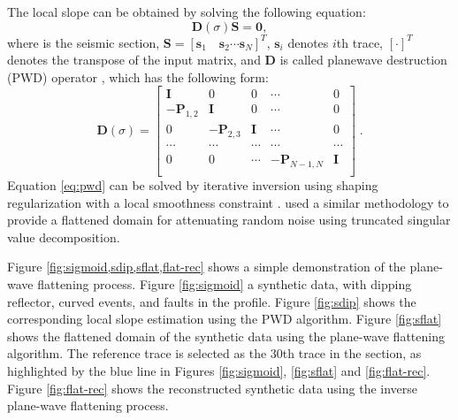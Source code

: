 The local slope can be obtained by solving the following equation:
\begin{equation}
\label{eq:pwd}
\mathbf{D}(\sigma)\mathbf{S} = \mathbf{0},
\end{equation}
where  is the seismic section, $\mathbf{S}=[\mathbf{s}_1\quad\mathbf{s}_2\cdots\mathbf{s}_N]^T$, $\mathbf{s}_i$ denotes $i$th trace, $[\cdot]^T$ denotes the transpose of the input matrix,  and $\mathbf{D}$ is called plane\new{-}wave destruction (PWD) operator \cite[]{fomel2002pwd}, which has the following form:
\begin{equation}
  \label{eq:d}
  \mathbf{D}(\sigma) = 
  \left[\begin{array}{ccccc}
      \mathbf{I} & 0 & 0 & \cdots & 0 \\
      - \mathbf{P}_{1,2} & \mathbf{I} & 0 & \cdots & 0 \\
      0 & - \mathbf{P}_{2,3} & \mathbf{I} & \cdots & 0 \\
      \cdots & \cdots & \cdots & \cdots & \cdots \\
      0 & 0 & \cdots & - \mathbf{P}_{N-1,N} & \mathbf{I} \\
    \end{array}\right]\;.
\end{equation}
Equation \ref{eq:pwd} can be solved by iterative inversion using shaping regularization with a local smoothness constraint \cite[]{fomel2007shape}. \cite{shuwei2015} used a similar methodology to provide a flattened domain for attenuating random noise using truncated singular value decomposition.

Figure \ref{fig:sigmoid,sdip,sflat,flat-rec} shows a simple demonstration of the plane-wave flattening process. Figure \ref{fig:sigmoid}  a synthetic data, with dipping reflector, curved events, and faults in the profile. Figure \ref{fig:sdip} shows the corresponding local slope estimation using the PWD algorithm. Figure \ref{fig:sflat} shows the flattened domain of the synthetic data using the plane-wave flattening algorithm. The reference trace is selected as the 30th trace in the section, as highlighted by the blue line in Figures \ref{fig:sigmoid}, \ref{fig:sflat} and \ref{fig:flat-rec}. Figure \ref{fig:flat-rec} shows the reconstructed synthetic data using the inverse plane-wave flattening process. 

